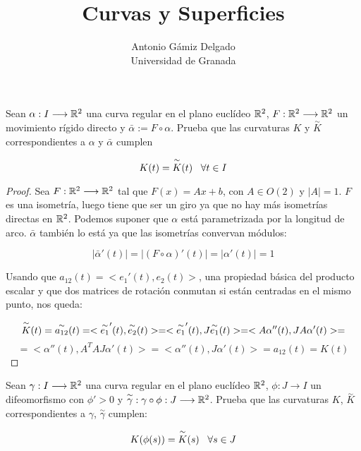 \documentclass[12pt]{article}
\begin{document}
\title{Curvas y Superficies}
\author{Antonio Gámiz Delgado\\ Universidad de Granada} 
 
\maketitle

\begin{ejercicio}
Sean $\alpha:I\longrightarrow \mathbb{R}^2$ una curva regular en el plano euclídeo $\mathbb{R}^2$, $F:\mathbb{R}^2\longrightarrow\mathbb{R}^2$ un movimiento rígido directo y $\bar{\alpha}:=F\circ\alpha$. Prueba que las curvaturas $K$ y $\overset{\sim}{K}$ correspondientes a $\alpha$ y $\bar{\alpha}$ cumplen 

\[
K(t)=\overset{\sim}{K}(t) \;\;\; \forall t \in I
\]
\end{ejercicio}

\begin{proof}

Sea $F : \mathbb{R}^2 \longrightarrow \mathbb{R}^2$ tal que $F(x)=Ax+b$, con $A\in O(2)$ y $|A|=1$. $F$ es una isometría, luego tiene que ser un giro ya que no hay más isometrías directas en $\mathbb{R}^2$. Podemos suponer que $\alpha$ está parametrizada por la longitud de arco. $\bar{\alpha}$ también lo está ya que las isometrías convervan módulos:

\[
|\bar{\alpha}'(t)|=|(F\circ\alpha)'(t)|=|\alpha'(t)|=1
\]

Usando que $a_{12}(t)=<e_1'(t),e_2(t)>$, una propiedad básica del producto escalar y que dos matrices de rotación conmutan si están centradas en el mismo punto, nos queda:

\[
\overset{\sim}{ K }(t)=\overset{\sim}{ a_{12} }(t)=<\overset{\sim}{ e_1 }'(t),\overset{\sim}{ e_2 }(t)>=<\overset{\sim}{ e_1 }'(t),J\overset{\sim}{ e_1 }(t)>=<A\alpha''(t),JA\alpha'(t)>=
\]
\[
=<\alpha''(t),A^TAJ\alpha'(t)>=<\alpha''(t),J\alpha'(t)>=a_{12}(t)=K(t)
\]

\end{proof}

\begin{ejercicio}
Sean $\gamma:I\longrightarrow\mathbb{R}^2$ una curva regular en el plano euclídeo $\mathbb{R}^2$, $\phi:J\longrightarrow I$ un difeomorfismo con $\phi'>0$ y $\overset{\sim}{\gamma}:\gamma\circ\phi:J\longrightarrow\mathbb{R}^2$. Prueba que las curvaturas $K$, $\overset{\sim}{K}$ correspondientes a $\gamma$, $\overset{\sim}{\gamma}$ cumplen:

\[
K(\phi(s))=\overset{\sim}{K}(s) \;\;\; \forall s \in J
\]

\end{ejercicio}
\end{document}
